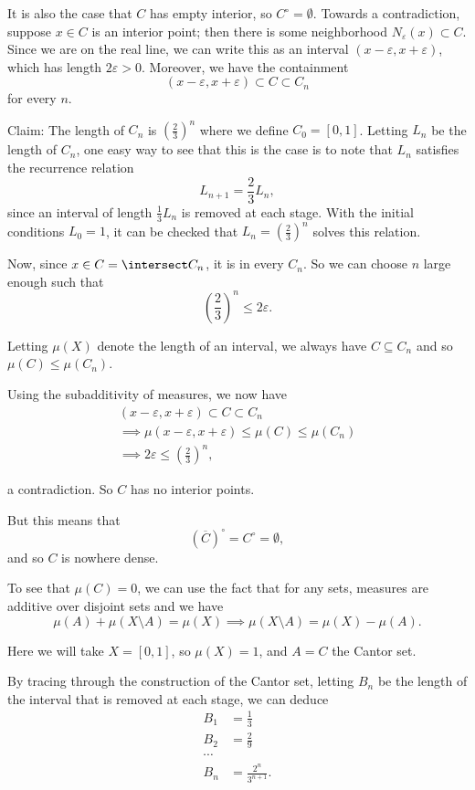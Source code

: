 \begin{solution}
\begin{enumerate}
    It is also the case that $C$ has empty interior, so $C^\circ = \emptyset$. Towards a contradiction, suppose $x\in C$ is an interior point; then there is some neighborhood $N_\varepsilon(x) \subset C$. Since we are on the real line, we can write this as an interval $(x-\varepsilon, x+\varepsilon)$, which has length $2\varepsilon > 0$. Moreover, we have the containment
    $$
    (x-\varepsilon, x+ \varepsilon) \subset C \subset C_n
    $$
    for every $n$.

    Claim: The length of $C_n$ is $(\frac 2 3)^n$ where we define $C_0 = [0, 1]$. Letting $L_n$ be the length of $C_n$, one easy way to see that this is the case is to note that $L_n$ satisfies the recurrence relation
    $$
    L_{n+1} = \frac2 3 L_n,
    $$
    since an interval of length $\frac 1 3 L_n$ is removed at each stage. With the initial conditions $L_0 = 1$, it can be checked that $L_n = \left( \frac 2 3 \right)^n$ solves this relation.

    Now, since $x\in C = \intersect C_n$, it is in every $C_n$. So we can choose $n$ large enough such that
    $$
    \left( \frac 2 3 \right)^n \leq 2\varepsilon.
    $$

    Letting $\mu(X)$ denote the length of an interval, we always have $C \subseteq C_n$ and so $\mu(C) \leq \mu(C_n)$.

    Using the subadditivity of measures, we now have
    \begin{align*}
    (x-\varepsilon, x+ \varepsilon) \subset C \subset C_n \\
    \implies \mu(x-\varepsilon, x+ \varepsilon) \leq \mu(C) \leq \mu(C_n) \\
    \implies 2\varepsilon \leq \left( \frac 2 3 \right)^n,
    \end{align*}

    a contradiction. So $C$ has no interior points.

    But this means that
    $$
    (\overline C)^\circ = C^\circ = \emptyset,
    $$
    and so $C$ is nowhere dense.

    To see that $\mu(C) = 0$, we can use the fact that for any sets, measures are additive over disjoint sets and we have
    $$
    \mu(A) + \mu(X \setminus A) = \mu(X) \implies \mu(X \setminus A) = \mu(X) - \mu(A).
    $$

    Here we will take $X = [0,1]$, so $\mu(X) = 1$, and $A = C$ the Cantor set.

    By tracing through the construction of the Cantor set, letting $B_n$ be the length of the interval that is removed at each stage, we can deduce
    \begin{align*}
      B_1 &= \frac 1 3 \\
      B_2 &= \frac 2 9 \\
      \cdots \\
      B_n &= \frac {2^n}{3^{n+1}}
    .\end{align*}


\end{enumerate}
\end{solution}
